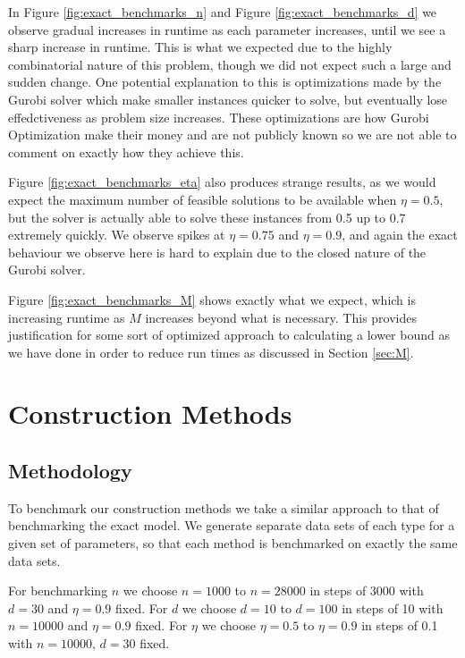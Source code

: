 \documentclass[11pt,twoside]{report}
\theoremstyle{definition}
\numberwithin{theorem}{section}
\numberwithin{definition}{section}
\numberwithin{lemma}{section}
\numberwithin{proposition}{section}
\numberwithin{equation}{section}
\numberwithin{figure}{section}
\begin{document}
In Figure \ref{fig:exact_benchmarks_n} and Figure \ref{fig:exact_benchmarks_d} we observe gradual increases in runtime as each parameter increases, until we see a sharp increase in runtime. This is what we expected due to the highly combinatorial nature of this problem, though we did not expect such a large and sudden change. One potential explanation to this is optimizations made by the Gurobi solver which make smaller instances quicker to solve, but eventually lose effedctiveness as problem size increases. These optimizations are how Gurobi Optimization make their money and are not publicly known so we are not able to comment on exactly how they achieve this.

Figure \ref{fig:exact_benchmarks_eta} also produces strange results, as we would expect the maximum number of feasible solutions to be available when $\eta=0.5$, but the solver is actually able to solve these instances from 0.5 up to 0.7 extremely quickly. We observe spikes at $\eta=0.75$ and $\eta=0.9$, and again the exact behaviour we observe here is hard to explain due to the closed nature of the Gurobi solver.

Figure \ref{fig:exact_benchmarks_M} shows exactly what we expect, which is increasing runtime as $M$ increases beyond what is necessary. This provides justification for some sort of optimized approach to calculating a lower bound as we have done in order to reduce run times as discussed in Section \ref{sec:M}.


\section{Construction Methods}
\subsection{Methodology}
To benchmark our construction methods we take a similar approach to that of benchmarking the exact model. We generate separate data sets of each type for a given set of parameters, so that each method is benchmarked on exactly the same data sets.

For benchmarking $n$ we choose $n=1000$ to $n=28000$ in steps of 3000 with $d=30$ and $\eta=0.9$ fixed. For $d$ we choose $d=10$ to $d=100$ in steps of 10 with $n=10000$ and $\eta=0.9$ fixed. For $\eta$ we choose $\eta=0.5$ to $\eta=0.9$ in steps of 0.1 with $n=10000$, $d=30$ fixed.
\end{document}
